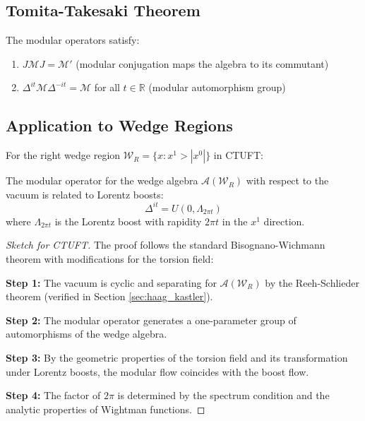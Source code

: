 \subsection{Tomita-Takesaki Theorem}

\begin{theorem}
The modular operators satisfy:
\begin{enumerate}
    \item $J\mathcal{M}J = \mathcal{M}'$ (modular conjugation maps the algebra to its commutant)
    \item $\Delta^{it}\mathcal{M}\Delta^{-it} = \mathcal{M}$ for all $t \in \mathbb{R}$ (modular automorphism group)
\end{enumerate}
\end{theorem}

\subsection{Application to Wedge Regions}

For the right wedge region $\mathcal{W}_R = \{ x : x^1 > |x^0| \}$ in CTUFT:

\begin{theorem}
The modular operator for the wedge algebra $\mathcal{A}(\mathcal{W}_R)$ with respect to the vacuum is related to Lorentz boosts:
\begin{equation}
    \Delta^{it} = U(0, \Lambda_{2\pi t})
\end{equation}
where $\Lambda_{2\pi t}$ is the Lorentz boost with rapidity $2\pi t$ in the $x^1$ direction.
\end{theorem}

\begin{proof}[Sketch for CTUFT]
The proof follows the standard Bisognano-Wichmann theorem with modifications for the torsion field:

\textbf{Step 1:} The vacuum is cyclic and separating for $\mathcal{A}(\mathcal{W}_R)$ by the Reeh-Schlieder theorem (verified in Section \ref{sec:haag_kastler}).

\textbf{Step 2:} The modular operator generates a one-parameter group of automorphisms of the wedge algebra.

\textbf{Step 3:} By the geometric properties of the torsion field and its transformation under Lorentz boosts, the modular flow coincides with the boost flow.

\textbf{Step 4:} The factor of $2\pi$ is determined by the spectrum condition and the analytic properties of Wightman functions.
\end{proof}

